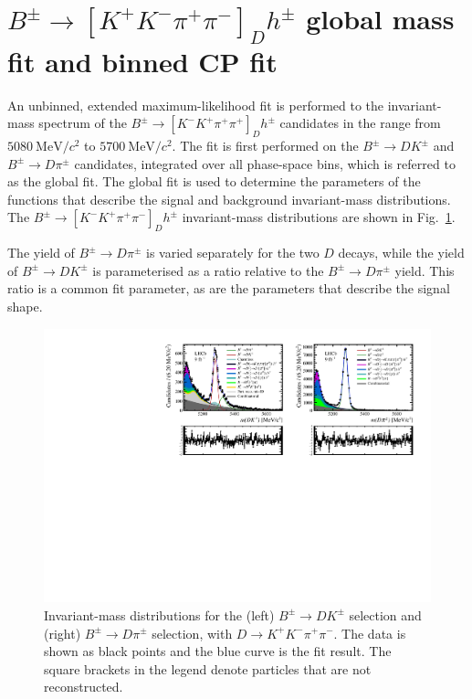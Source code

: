 \documentclass[12pt, a4paper, notitlepage, onecolumn]{article}
\begin{document}
\section{\texorpdfstring{$B^\pm\to[K^+K^-\pi^+\pi^-]_Dh^\pm$}{B2DhD2KKpipi} global mass fit and binned CP fit}
\noindent An unbinned, extended maximum-likelihood fit is performed to the invariant-mass spectrum of the $B^\pm\to[K^-K^+\pi^+\pi^+]_Dh^\pm$ candidates in the range from $\SI{5080}{\mega\eV/c^2}$ to $\SI{5700}{\mega\eV/c^2}$. The fit is first performed on the $B^\pm\to DK^\pm$ and $B^\pm\to D\pi^\pm$ candidates, integrated over all phase-space bins, which is referred to as the global fit. The global fit is used to determine the parameters of the functions that describe the signal and background invariant-mass distributions. The $B^\pm\to[K^-K^+\pi^+\pi^-]_Dh^\pm$ invariant-mass distributions are shown in Fig.~\ref{figure:Global_fit}.

The yield of $B^\pm\to D\pi^\pm$ is varied separately for the two $D$ decays, while the yield of $B^\pm\to DK^\pm$ is parameterised as a ratio relative to the $B^\pm\to D\pi^\pm$ yield. This ratio is a common fit parameter, as are the parameters that describe the signal shape.

\begin{figure}[htb]
    \centering
    \includegraphics[width=1.0\textwidth,trim={0 2.9cm 0 0},clip]{Plots/d2kkpipi_fiveL_allDP.pdf}
    \caption{Invariant-mass distributions for the (left) $B^\pm\to DK^\pm$ selection and (right) $B^\pm\to D\pi^\pm$ selection, with $D\to K^+K^-\pi^+\pi^-$. The data is shown as black points and the blue curve is the fit result. The square brackets in the legend denote particles that are not reconstructed.}
    \label{figure:Global_fit}
\end{figure}
\end{document}
